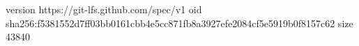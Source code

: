 version https://git-lfs.github.com/spec/v1
oid sha256:f5381552d7ff03bb0161cbb4e5cc871fb8a3927efe2084cf5e5919b0f8157c62
size 43840
